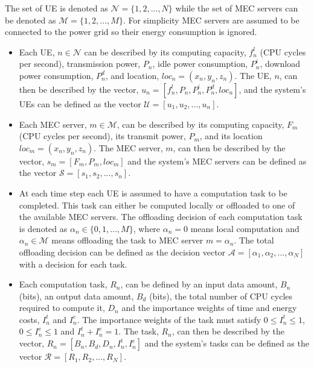 The set of \acrshort{UE} is denoted as $\mathcal{N} = \{1, 2, ..., N\}$ while the set of \acrshort{MEC} servers can be denoted as $\mathcal{M} = \{1, 2, ..., M\}$. For simplicity \acrshort{MEC} servers are assumed to be connected to the power grid so their energy consumption is ignored.
\begin{itemize}
    \item Each \acrshort{UE}, $n \in \mathcal{N}$ can be described by its computing capacity, $f_n^l$ (\acrshort{CPU} cycles per second), transmission power, $P_n$, idle power consumption, $P^i_n$, download power consumption, $P_n^d$, and location, $loc_n = (x_n, y_n, z_n)$. The UE, $n$, can then be described by the vector, $u_n = [f_n^l, P_n, P_n^i, P_n^d, loc_n]$, and the system's \acrshort{UE}s can be defined as the vector $\mathcal{U} = [u_1, u_2, ..., u_n]$.

    \item Each \acrshort{MEC} server, $m \in \mathcal{M}$, can be described by its computing capacity, $F_m$ (\acrshort{CPU} cycles per second), its transmit power, $P_m$, and its location $loc_m = (x_n, y_n, z_n)$. The \acrshort{MEC} server, $m$, can then be described by the vector, $s_m = [F_m, P_m, loc_m]$ and the system's \acrshort{MEC} servers can be defined as the vector $\mathcal{S} = [s_1, s_2, ..., s_n]$.

    \item At each time step each \acrshort{UE} is assumed to have a computation task to be completed. This task can either be computed locally or offloaded to one of the available \acrshort{MEC} servers. The offloading decision of each computation task is denoted as $\alpha_n \in \{0, 1, ..., M\}$, where $\alpha_n = 0$ means local computation and $\alpha_n \in \mathcal{M}$ means offloading the task to \acrshort{MEC} server $m = \alpha_n$. The total offloading decision can be defined as the decision vector $\mathcal{A} = [\alpha_1, \alpha_2, ..., \alpha_N]$ with a decision for each task.

    \item Each computation task, $R_n$, can be defined by an input data amount, $B_n$ (bits), an output data amount, $B_d$ (bits), the total number of \acrshort{CPU} cycles required to compute it, $D_n$ and the importance weights of time and energy costs, $I_n^t$ and $I_n^e$. The importance weights of the task must satisfy $0 \leq I_n^t \leq 1$, $0 \leq I_n^e \leq 1$ and $I_n^t + I_n^e = 1$. The task, $R_n$, can then be described by the vector, $R_n = [B_n, B_d, D_n, I_n^t, I_n^e]$ and the system's tasks can be defined as the vector $\mathcal{R} = [R_1, R_2, ..., R_N]$.


\end{itemize}

